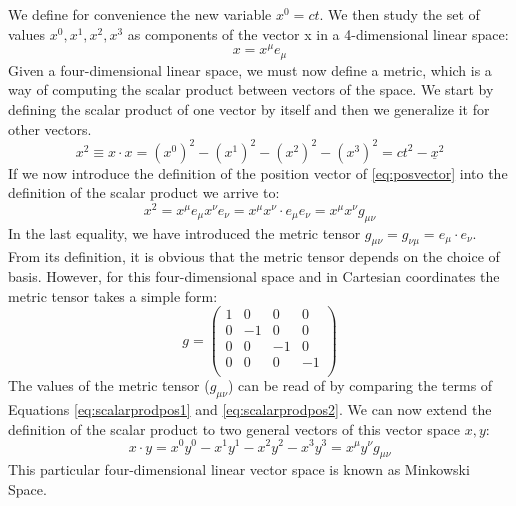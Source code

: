 \vspace{2mm}\noindent We define for convenience the new variable $x^0 = ct$. We then study the set of values $x^0,x^1,x^2,x^3$ as components of the vector x in a 4-dimensional linear space:
\begin{equation}
    x = x^\mu e_\mu
    \label{eq:posvector}
\end{equation}
Given a four-dimensional linear space, we must now define a metric, which is a way of computing the scalar product between vectors of the space. We start by defining the scalar product of one vector by itself and then we generalize it for other vectors.
\begin{equation}
    x^2 \equiv x\cdot x = (x^0)^2-(x^1)^2-(x^2)^2-(x^3)^2 = ct^2 - \underline x^2
    \label{eq:scalarprodpos1}
\end{equation}
If we now introduce the definition of the position vector of \ref{eq:posvector} into the definition of the scalar product we arrive to:
\begin{equation}
x^2 =  x^\mu e_\mu  x^\nu e_\nu =  x^\mu x^\nu  \cdot e_\mu  e_\nu = x^\mu x^\nu g_{\mu\nu}
\label{eq:scalarprodpos2}
\end{equation}
In the last equality, we have introduced the metric tensor $g_{\mu\nu} = g_{\nu\mu} = e_\mu \cdot e_\nu $. From its definition, it is obvious that the metric tensor depends on the choice of basis. However, for this four-dimensional space and in Cartesian coordinates the metric tensor takes a simple form:
\begin{equation}
    g = \begin{pmatrix}
1 & 0 & 0 & 0\\
0 & -1 & 0 & 0\\
0 & 0 & -1 & 0\\
0 & 0 & 0 & -1\\
\end{pmatrix}
\end{equation}
The values of the metric tensor ($g_{\mu\nu}$) can be read of by comparing the terms of Equations \ref{eq:scalarprodpos1} and \ref{eq:scalarprodpos2}. We can now extend the definition of the scalar product to two general vectors of this vector space $x,y$:
\begin{equation}
    x\cdot y = x^0y^0-x^1y^1-x^2y^2-x^3y^3 = x^\mu y^\nu g_{\mu\nu} 
\end{equation}
This particular four-dimensional linear vector space is known as Minkowski Space. 

